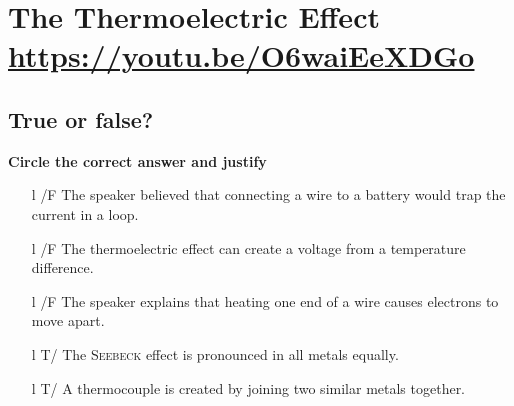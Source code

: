 \documentclass[a4paper, 11pt, final, garamond]{book}
\begin{document}
\setcounter{chapter}{2}


\chapter{The Thermoelectric Effect \url{https://youtu.be/O6waiEeXDGo}}

\section{True or false\!?}

\textbf{Circle the correct answer and justify }
\begin{enumerate}[label=\sqenumi, leftmargin=10pt]
	\item[l]{/F} %
	      The speaker believed that connecting a wire to a battery would trap the
	      current in a loop.
	      \smallbreak
	      \smallbreak
	      \dotfill
	\item[l]{/F} %
	      The thermoelectric effect can create a voltage from a temperature difference.
	      \smallbreak
	      \smallbreak
	      \dotfill
	\item[l]{/F} %
	      The speaker explains that heating one end of a wire causes electrons to move
	      apart.
	      \smallbreak
	      \smallbreak
	      \dotfill
	\item[l]{T/} %
	      The \textsc{Seebeck} effect is pronounced in all metals equally.
	      \smallbreak
	      \smallbreak
	      \dotfill
	\item[l]{T/} %
	      A thermocouple is created by joining two similar metals together.
	      \smallbreak
	      \smallbreak

\end{enumerate}
\end{document}
